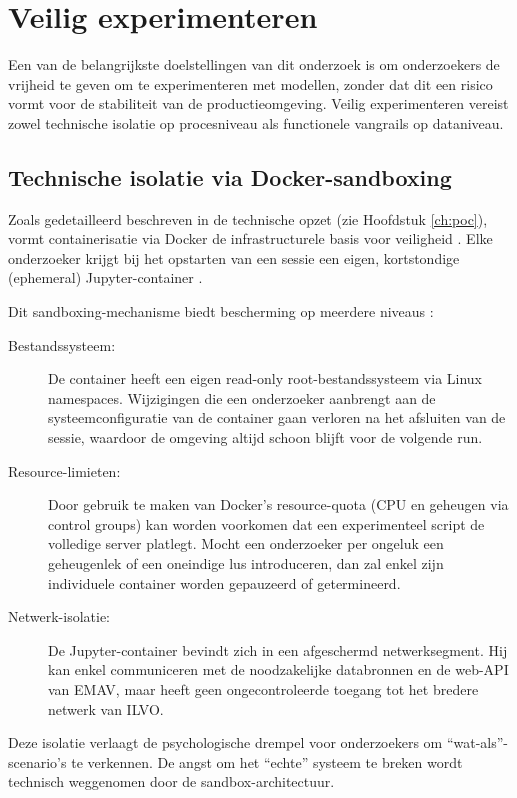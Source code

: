 \chapter{Veilig experimenteren}
\label{ch:veilig_experimenteren}

Een van de belangrijkste doelstellingen van dit onderzoek is om onderzoekers de vrijheid te geven om te experimenteren met modellen, zonder dat dit een risico vormt voor de stabiliteit van de productieomgeving. Veilig experimenteren vereist zowel technische isolatie op procesniveau als functionele vangrails op dataniveau.

\section{Technische isolatie via Docker-sandboxing}
Zoals gedetailleerd beschreven in de technische opzet (zie Hoofdstuk \ref{ch:poc}), vormt containerisatie via Docker de infrastructurele basis voor veiligheid \autocite{Boettiger2015}. Elke onderzoeker krijgt bij het opstarten van een sessie een eigen, kortstondige (ephemeral) Jupyter-container \autocite{ProjectBinder2018}.

Dit sandboxing-mechanisme biedt bescherming op meerdere niveaus \autocite{Bui2016, Shu2020}:
\begin{description}
    \item[Bestandssysteem:] De container heeft een eigen read-only root-bestandssysteem via Linux namespaces. Wijzigingen die een onderzoeker aanbrengt aan de systeemconfiguratie van de container gaan verloren na het afsluiten van de sessie, waardoor de omgeving altijd schoon blijft voor de volgende run.
    \item[Resource-limieten:] Door gebruik te maken van Docker's resource-quota (CPU en geheugen via control groups) kan worden voorkomen dat een experimenteel script de volledige server platlegt. Mocht een onderzoeker per ongeluk een geheugenlek of een oneindige lus introduceren, dan zal enkel zijn individuele container worden gepauzeerd of getermineerd.
    \item[Netwerk-isolatie:] De Jupyter-container bevindt zich in een afgeschermd netwerksegment. Hij kan enkel communiceren met de noodzakelijke databronnen en de web-API van EMAV, maar heeft geen ongecontroleerde toegang tot het bredere netwerk van ILVO.
\end{description}
Deze isolatie verlaagt de psychologische drempel voor onderzoekers om ``wat-als''-scenario's te verkennen. De angst om het ``echte'' systeem te breken wordt technisch weggenomen door de sandbox-architectuur.

